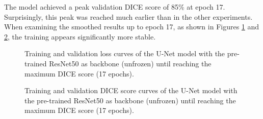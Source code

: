 The model achieved a peak validation DICE score of 85\% at epoch 17. Surprisingly, this peak was reached much earlier 
than in the other experiments. When examining the smoothed results up to epoch 17, as shown in Figures 
\ref{fig:renet50_unfrozen_loss_curve_smooth} and \ref{fig:renet50_unfrozen_dice_curve_smooth}, the 
training appears significantly more stable.

\begin{figure}[ht]
    \centering
    \caption{Training and validation loss curves of the U-Net model with the pre-trained ResNet50 as backbone (unfrozen) until reaching the maximum DICE score (17 epochs).}
    \label{fig:renet50_unfrozen_loss_curve_smooth}
\end{figure}


\begin{figure}[H]
    \centering
    \caption{Training and validation DICE score curves of the U-Net model with the pre-trained ResNet50 as backbone (unfrozen) until reaching the maximum DICE score (17 epochs).}
    \label{fig:renet50_unfrozen_dice_curve_smooth}
\end{figure}
